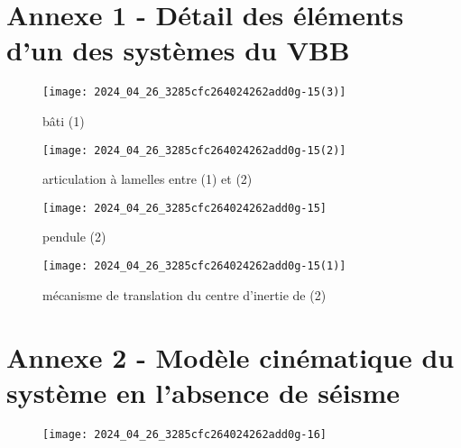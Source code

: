 

\section*{Annexe 1 - Détail des éléments d'un des systèmes du VBB}
\begin{figure}[!h]
\centering
\texttt{[image: 2024\_04\_26\_3285cfc264024262add0g-15(3)]}
\caption{\label{ccmp2023_fig_ann_1_1} bâti (1)}
\end{figure}



\begin{figure}[!h]
\centering
\texttt{[image: 2024\_04\_26\_3285cfc264024262add0g-15(2)]}
\caption{\label{ccmp2023_fig_ann_1_2}articulation à lamelles entre (1) et (2)}
\end{figure}



\begin{figure}[!h]
\centering
\texttt{[image: 2024\_04\_26\_3285cfc264024262add0g-15]}
\caption{\label{ccmp2023_ann_1_2} pendule (2)}
\end{figure}



\begin{figure}[!h]
\centering
\texttt{[image: 2024\_04\_26\_3285cfc264024262add0g-15(1)]}
\caption{\label{ccmp2023_ann_1_3}mécanisme de translation du centre d'inertie de (2)}
\end{figure}



\section*{Annexe 2 - Modèle cinématique du système en l'absence de séisme}
\begin{figure}[!h]
\centering
\texttt{[image: 2024\_04\_26\_3285cfc264024262add0g-16]}
\end{figure}


